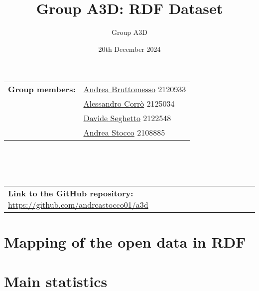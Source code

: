 \documentclass{article}
\title{Group A3D: RDF Dataset}
\author{Group A3D}
\date{20th December 2024}
\begin{document}
\maketitle

\noindent\begin{tabular}{@{}ll}
	\textbf{Group members:}
  & \href{mailto:andrea.bruttomesso.1@studenti.unipd.it}{Andrea Bruttomesso} 2120933\\
	& \href{mailto:alessandro.corro.1@studenti.unipd.it}{Alessandro Corr\`o} 2125034\\
	& \href{mailto:davide.seghetto@studenti.unipd.it}{Davide Seghetto} 2122548\\
	& \href{mailto:andrea.stocco.8@studenti.unipd.it}{Andrea Stocco} 2108885\\
\end{tabular}
\\\\\\
\noindent\begin{tabular}{@{}ll}
	\textbf{Link to the GitHub repository:} \href{https://github.com/andreastocco01/a3d}{https://github.com/andreastocco01/a3d}
\end{tabular}

\section*{Mapping of the open data in RDF}

\section*{Main statistics}
\end{document}
